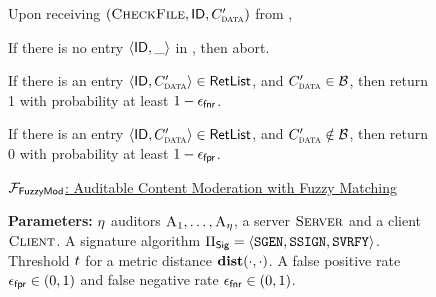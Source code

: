 \begin{figure}[h]
{\begin{minipage}[t]{0.45\textwidth}
		
		\item Upon receiving $(\checkContent,  \genericFileID, \clientMeta')$ from \server, 
		\enumListStartResume

		\item If there is no entry $\langle \mathsf{ID}, \_ \rangle$ in \keyList, then abort. 
		
		\item If there is an entry $\langle \genericFileID, \clientMeta' \rangle \in \retList$, and $\clientMeta' \in \blocklist$, then return 1 with probability at least $1 - \epsilon_\mathsf{fnr}$. 

		\item If there is an entry $\langle \genericFileID, \clientMeta' \rangle \in \retList$, and $\clientMeta' \notin \blocklist$, then return 0 with probability at least $1 - \epsilon_\mathsf{fpr}$.  


	

		\enumListEnd

			\enumListEnd


\end{minipage}
\hspace{5pt}
\vrule
\hspace{5pt}


\begin{minipage}[t]{0.45\textwidth}
\footnotesize

\noindent\underline{$\mathcal{F}_{\mathsf{FuzzyMod}}$: Auditable Content Moderation with Fuzzy Matching}
		
		

		\smallskip\noindent\textbf{Parameters:} $\eta$ auditors $\auditor[1], \dots, \auditor[\numAuditors]$, a server $\textsc{Server}$ and a client $\textsc{Client}$. A signature algorithm $\sigSchemeDefn$. 
Threshold $t$ for a metric distance $\distanceNotation[\distance][\cdot][\cdot]$. A false positive rate $\epsilon_\mathsf{fpr} \in (0, 1)$ and false negative rate $\epsilon_\mathsf{fnr} \in (0,1)$. 
		

\end{minipage}}
\end{figure}

